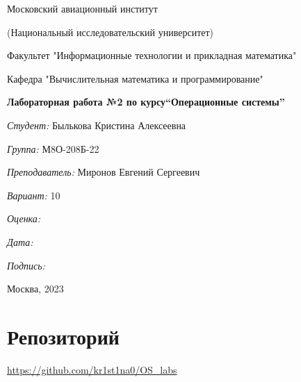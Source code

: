 \documentclass[a4paper, 12pt]{article}
\begin{document}
\thispagestyle{empty}	
\begin{center}
	Московский авиационный институт
	
	(Национальный исследовательский университет)
	
	Факультет "Информационные технологии и прикладная математика"
	
	Кафедра "Вычислительная математика и программирование"
	
\end{center}
\vspace{40ex}
\begin{center}
	\textbf{\large{Лабораторная работа №2 по курсу\linebreak \textquotedblleft Операционные системы\textquotedblright}}
\end{center}
\vspace{35ex}
\begin{flushright}
	\textit{Студент: } Былькова Кристина Алексеевна
	
	\vspace{2ex}
	\textit{Группа: } М8О-208Б-22
	
	\vspace{2ex}
	\textit{Преподаватель: } Миронов Евгений Сергеевич
	
	\vspace{2ex}
	\textit{Вариант: } 10
	
	\vspace{2ex}
	\textit{Оценка: } \underline{\quad\quad\quad\quad\quad\quad}
	
	 \vspace{2ex}
	\textit{Дата: } \underline{\quad\quad\quad\quad\quad\quad}
	
	\vspace{2ex}
	\textit{Подпись: } \underline{\quad\quad\quad\quad\quad\quad}
	
\end{flushright}

\vspace{5ex}

\begin{vfill}
	\begin{center}
		Москва, 2023
	\end{center}	
\end{vfill}
\newpage

\begingroup
\color{black}
\tableofcontents\newpage
\endgroup

\section{Репозиторий}
\href{https://github.com/kr1st1na0/OS\_labs}{https://github.com/kr1st1na0/OS\_labs}
\end{document}
